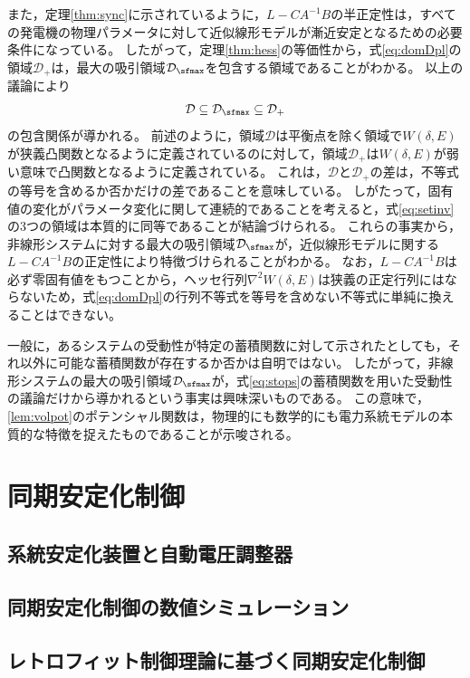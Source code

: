 \documentclass[tombow,dvipdfmx]{corona-a5-1.1}
\begin{document}
また，定理\ref{thm:sync}に示されているように，$L-CA^{-1}B$の半正定性は，すべての発電機の物理パラメータに対して近似線形モデルが漸近安定となるための必要条件になっている。
したがって，定理\ref{thm:hess}の等価性から，式\ref{eq:domDpl}の領域$\mathcal{D}_{+}$は，最大の吸引領域$\mathcal{D}_{\sfmax}$を包含する領域であることがわかる。
以上の議論により
\begin{align}\label{eq:setinv}
\mathcal{D} \subseteq \mathcal{D}_{\sfmax} \subseteq \mathcal{D}_{+}
\end{align}
の包含関係が導かれる。
前述のように，領域$\mathcal{D}$は平衡点を除く領域で$W(\delta,E)$が狭義凸関数となるように定義されているのに対して，領域$\mathcal{D}_{+}$は$W(\delta,E)$が弱い意味で凸関数となるように定義されている。
これは，$\mathcal{D}$と$\mathcal{D}_{+}$の差は，不等式の等号を含めるか否かだけの差であることを意味している。
しがたって，固有値の変化がパラメータ変化に関して連続的であることを考えると，式\ref{eq:setinv}の3つの領域は本質的に同等であることが結論づけられる。
これらの事実から，非線形システムに対する最大の吸引領域$\mathcal{D}_{\sfmax}$が，近似線形モデルに関する$L-CA^{-1}B$の正定性により特徴づけられることがわかる。
なお，$L-CA^{-1}B$は必ず零固有値をもつことから，ヘッセ行列$\nabla^2 W(\delta,E)$は狭義の正定行列にはならないため，式\ref{eq:domDpl}の行列不等式を等号を含めない不等式に単純に換えることはできない。

一般に，あるシステムの受動性が特定の蓄積関数に対して示されたとしても，それ以外に可能な蓄積関数が存在するか否かは自明ではない。
したがって，非線形システムの最大の吸引領域$\mathcal{D}_{\sfmax}$が，式\ref{eq:stops}の蓄積関数を用いた受動性の議論だけから導かれるという事実は興味深いものである。
この意味で，\ref{lem:volpot}のポテンシャル関数は，物理的にも数学的にも電力系統モデルの本質的な特徴を捉えたものであることが示唆される。


\section{同期安定化制御}
\subsection{系統安定化装置と自動電圧調整器}
\subsection{同期安定化制御の数値シミュレーション}
\subsection{レトロフィット制御理論に基づく同期安定化制御\advanced}


\newpage
%
%
\end{document}
